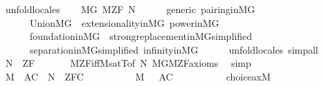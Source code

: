 \begin{isabellebody}
\ unfold{\isacharunderscore}{\kern0pt}locales\isanewline
\ \ \isamarkupfalse%
\ MG{\isacharcolon}{\kern0pt}\ M{\isacharunderscore}{\kern0pt}ZF\ {\isachardoublequoteopen}{\isacharquery}{\kern0pt}N{\isachardoublequoteclose}\isanewline
\ \ \ \ \isamarkupfalse%
\ generic\ pairing{\isacharunderscore}{\kern0pt}in{\isacharunderscore}{\kern0pt}MG\ \isanewline
\ \ \ \ \ \ Union{\isacharunderscore}{\kern0pt}MG\ \ extensionality{\isacharunderscore}{\kern0pt}in{\isacharunderscore}{\kern0pt}MG\ power{\isacharunderscore}{\kern0pt}in{\isacharunderscore}{\kern0pt}MG\isanewline
\ \ \ \ \ \ foundation{\isacharunderscore}{\kern0pt}in{\isacharunderscore}{\kern0pt}MG\ \ strong{\isacharunderscore}{\kern0pt}replacement{\isacharunderscore}{\kern0pt}in{\isacharunderscore}{\kern0pt}MG{\isacharbrackleft}{\kern0pt}simplified{\isacharbrackright}{\kern0pt}\isanewline
\ \ \ \ \ \ separation{\isacharunderscore}{\kern0pt}in{\isacharunderscore}{\kern0pt}MG{\isacharbrackleft}{\kern0pt}simplified{\isacharbrackright}{\kern0pt}\ infinity{\isacharunderscore}{\kern0pt}in{\isacharunderscore}{\kern0pt}MG\isanewline
\ \ \ \ \isamarkupfalse%
\ unfold{\isacharunderscore}{\kern0pt}locales\ simp{\isacharunderscore}{\kern0pt}all\isanewline
\ \ \isamarkupfalse%
\ {\isachardoublequoteopen}{\isacharquery}{\kern0pt}N\ {\isasymTurnstile}\ ZF{\isachardoublequoteclose}\ \isanewline
\ \ \ \ \isamarkupfalse%
\ M{\isacharunderscore}{\kern0pt}ZF{\isacharunderscore}{\kern0pt}iff{\isacharunderscore}{\kern0pt}M{\isacharunderscore}{\kern0pt}satT{\isacharbrackleft}{\kern0pt}of\ {\isacharquery}{\kern0pt}N{\isacharbrackright}{\kern0pt}\ MG{\isachardot}{\kern0pt}M{\isacharunderscore}{\kern0pt}ZF{\isacharunderscore}{\kern0pt}axioms\ \isamarkupfalse%
\ simp\isanewline
\ \ \isamarkupfalse%
\ \isanewline
\ \ \isamarkupfalse%
\ {\isachardoublequoteopen}M{\isacharcomma}{\kern0pt}\ {\isacharbrackleft}{\kern0pt}{\isacharbrackright}{\kern0pt}{\isasymTurnstile}\ AC\ {\isasymLongrightarrow}\ {\isacharquery}{\kern0pt}N\ {\isasymTurnstile}\ ZFC{\isachardoublequoteclose}\isanewline
\ \ \isamarkupfalse%
\ {\isacharminus}{\kern0pt}\isanewline
\ \ \ \ \isamarkupfalse%
\ {\isachardoublequoteopen}M{\isacharcomma}{\kern0pt}\ {\isacharbrackleft}{\kern0pt}{\isacharbrackright}{\kern0pt}\ {\isasymTurnstile}\ AC{\isachardoublequoteclose}\isanewline
\ \ \ \ \isamarkupfalse%
\isanewline
\ \ \ \ \isamarkupfalse%
\ {\isachardoublequoteopen}choice{\isacharunderscore}{\kern0pt}ax{\isacharparenleft}{\kern0pt}{\isacharhash}{\kern0pt}{\isacharhash}{\kern0pt}M{\isacharparenright}{\kern0pt}{\isachardoublequoteclose}\isanewline

\end{isabellebody}
